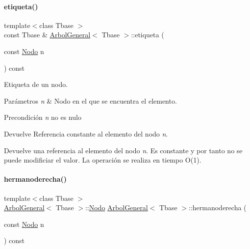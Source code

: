 \paragraph{\texorpdfstring{etiqueta()}{etiqueta()}\hspace{0.1cm}{\footnotesize\ttfamily [2/2]}}
{\footnotesize\ttfamily template$<$class Tbase $>$ \\
const Tbase \& \hyperlink{classArbolGeneral}{Arbol\+General}$<$ Tbase $>$\+::etiqueta (\begin{DoxyParamCaption}\item[{const \hyperlink{classArbolGeneral_a12cc1b74a9095d89bc7334290d332f7a}{Nodo}}]{n }\end{DoxyParamCaption}) const}



Etiqueta de un nodo. 


\begin{DoxyParams}{Parámetros}
{\em n} & Nodo en el que se encuentra el elemento. \\
\hline
\end{DoxyParams}
\begin{DoxyPrecond}{Precondición}
{\itshape n} no es nulo 
\end{DoxyPrecond}
\begin{DoxyReturn}{Devuelve}
Referencia constante al elemento del nodo {\itshape n}.
\end{DoxyReturn}
Devuelve una referencia al elemento del nodo {\itshape n}. Es constante y por tanto no se puede modificiar el valor. La operación se realiza en tiempo O(1). \hypertarget{classArbolGeneral_a33984e2259e92dc86a18b6ee1e89f251}{}\label{classArbolGeneral_a33984e2259e92dc86a18b6ee1e89f251} 
\paragraph{\texorpdfstring{hermanoderecha()}{hermanoderecha()}}
{\footnotesize\ttfamily template$<$class Tbase $>$ \\
\hyperlink{classArbolGeneral}{Arbol\+General}$<$ Tbase $>$\+::\hyperlink{classArbolGeneral_a12cc1b74a9095d89bc7334290d332f7a}{Nodo} \hyperlink{classArbolGeneral}{Arbol\+General}$<$ Tbase $>$\+::hermanoderecha (\begin{DoxyParamCaption}\item[{const \hyperlink{classArbolGeneral_a12cc1b74a9095d89bc7334290d332f7a}{Nodo}}]{n }\end{DoxyParamCaption}) const}



